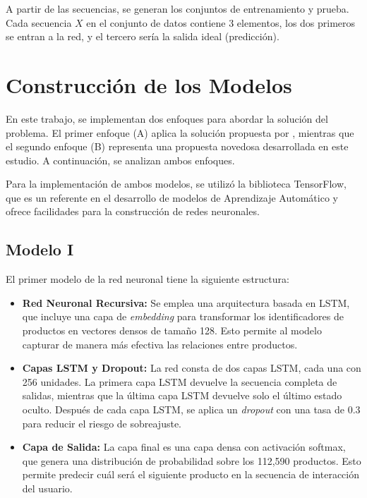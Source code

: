 \documentclass[runningheads]{llncs}
\begin{document}
A partir de las secuencias, se generan los conjuntos de entrenamiento y prueba. Cada secuencia $X$ en el conjunto de datos contiene 3 elementos, los dos primeros se entran a la red, y el tercero sería la salida ideal (predicción).

\section{Construcción de los Modelos}
	En este trabajo, se implementan dos enfoques para abordar la solución del problema. El primer enfoque (A) aplica la solución propuesta por \cite{hidasi2016session}, mientras que el segundo enfoque (B) representa una propuesta novedosa desarrollada en este estudio. A continuación, se analizan ambos enfoques.
	
	Para la implementación de ambos modelos, se utilizó la biblioteca TensorFlow, que es un referente en el desarrollo de modelos de Aprendizaje Automático y ofrece facilidades para la construcción de redes neuronales.
	
	\subsection{Modelo I}
	El primer modelo de la red neuronal tiene la siguiente estructura:
	\begin{itemize}
	    \item \textbf{Red Neuronal Recursiva:} Se emplea una arquitectura basada en LSTM, que incluye una capa de \textit{embedding} para transformar los identificadores de productos en vectores densos de tamaño 128. Esto permite al modelo capturar de manera más efectiva las relaciones entre productos.
	    
	    \item \textbf{Capas LSTM y Dropout:} La red consta de dos capas LSTM, cada una con 256 unidades. La primera capa LSTM devuelve la secuencia completa de salidas, mientras que la última capa LSTM devuelve solo el último estado oculto. Después de cada capa LSTM, se aplica un \textit{dropout} con una tasa de $0.3$ para reducir el riesgo de sobreajuste.
	    
	    \item \textbf{Capa de Salida:} La capa final es una capa densa con activación softmax, que genera una distribución de probabilidad sobre los 112,590 productos. Esto permite predecir cuál será el siguiente producto en la secuencia de interacción del usuario.
	\end{itemize}
\end{document}

